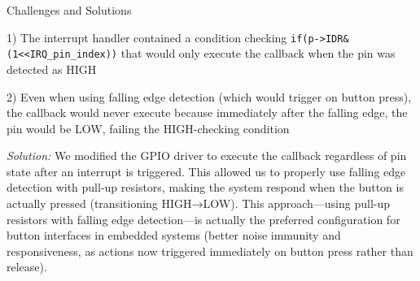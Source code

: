 \documentclass[12pt,a4paper]{article}
\begin{document}
\begin{mytitledbox}{Challenges and Solutions}
\begin{enumerate}[label=\textcolor{myblue}{\textbf{\arabic*.}}, itemsep=1.5mm]
    1) The interrupt handler contained a condition checking \verb|if(p->IDR&(1<<IRQ_pin_index))| that would only execute the callback when the pin was detected as HIGH
    
    2) Even when using falling edge detection (which would trigger on button press), the callback would never execute because immediately after the falling edge, the pin would be LOW, failing the HIGH-checking condition

    \begin{solutionbox}
    \textit{Solution:} We modified the GPIO driver to execute the callback regardless of pin state after an interrupt is triggered. This allowed us to properly use falling edge detection with pull-up resistors, making the system respond when the button is actually pressed (transitioning HIGH→LOW). This approach—using pull-up resistors with falling edge detection—is actually the preferred configuration for button interfaces in embedded systems (better noise immunity and responsiveness, as actions now triggered immediately on button press rather than release).
    \end{solutionbox}
    
    
\end{enumerate}
\end{mytitledbox}



\end{document}
